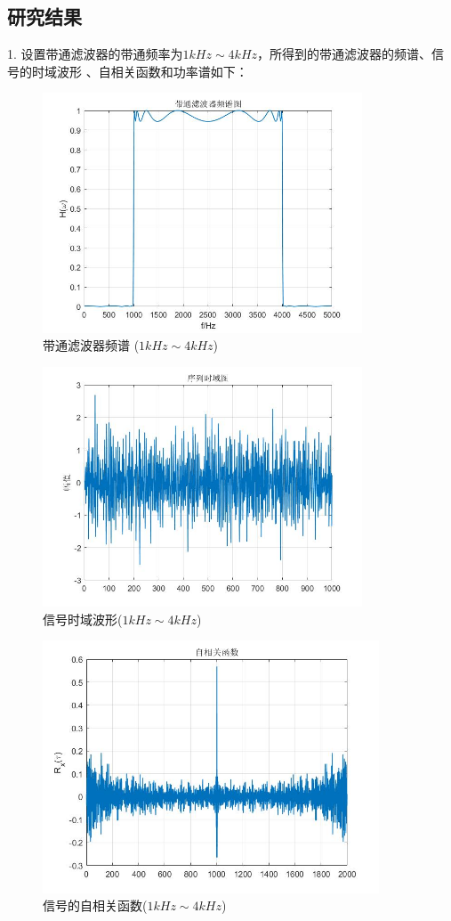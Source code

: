 \documentclass[UTF-8, a4paper, 12pt]{ctexart}
\begin{document}
\subsection{研究结果}
1. 设置带通滤波器的带通频率为$1kHz\sim 4kHz$，所得到的带通滤波器的频谱、信号的时域波形
、自相关函数和功率谱如下：
\begin{figure}[htbp]
    \centering
    \includegraphics[width=9.5cm]{figs/f1_1.jpg}
    \caption{带通滤波器频谱 ($1kHz\sim 4kHz$)}
\end{figure}
\begin{figure}[htbp]
    \centering
    \includegraphics[width=9.5cm]{figs/f1-2.jpg}
    \caption{信号时域波形($1kHz\sim 4kHz$)}
    \label{f12}
\end{figure}
\begin{figure}[htbp]
    \centering
    \includegraphics[width=10cm]{figs/f1_3.jpg}
    \caption{信号的自相关函数($1kHz\sim 4kHz$)}
\end{figure}
\end{document}

